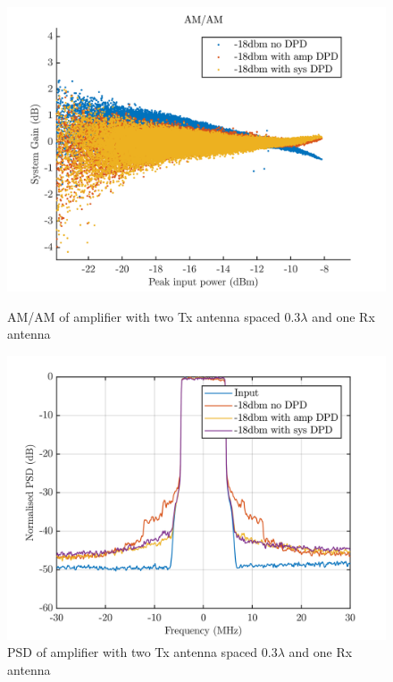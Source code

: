 \begin{figure}[H]
  \centering
  \begin{minipage}[b]{0.5\textwidth}
	\includegraphics[scale = 0.5]{figures/measurement/cree/two/amam_two_ant_0p3.png}
	\caption{AM/AM of amplifier with two Tx antenna spaced $0.3\lambda$ and one Rx antenna}
    \label{fig:cree_amam_two_ant2}
  \end{minipage}
  \hfill
  \begin{minipage}[b]{0.4\textwidth}
\includegraphics[scale = 0.5]{figures/measurement/cree/two/psd_two_ant_0p3.png}
\caption{PSD of amplifier with two Tx antenna spaced $0.3\lambda$ and one Rx antenna}
    \label{fig:cree_psd_two_ant2}
  \end{minipage}
\end{figure}

